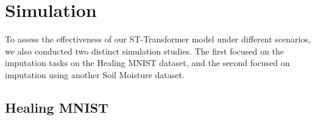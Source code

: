 \documentclass[review]{elsarticle}
\begin{document}
%
%
%
%
%









\clearpage
\appendix


\section{Simulation}\label{sec: simulation}
To assess the effectiveness of our ST-Transformer model under different scenarios, we also conducted two distinct simulation studies. The first focused on the imputation tasks on the Healing MNIST dataset, and the second focused on imputation using another Soil Moisture dataset.



\subsection{Healing MNIST}
\end{document}
